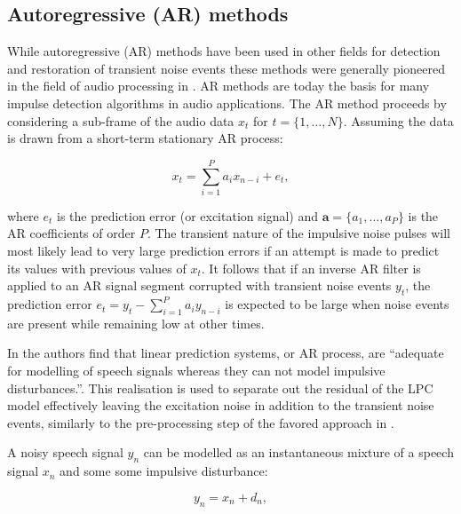 \subsection{Autoregressive (AR) methods}\label{sec:LitRevAR}
While autoregressive (AR) methods have been used in other fields for detection and restoration of transient noise events \cite{Arakawa1986} these methods were generally pioneered in the field of audio processing in \cite{Vaseghi1988thesis}\cite{Vaseghi1988}\cite{Vaseghi1990}. AR methods are today the basis for many impulse detection algorithms in audio applications\cite{Karjalainen1997}\cite{Esquef2000}\cite{Haermae2000}\cite{Esquef2002}\cite{Kauppinen2002}\cite{Wolfe2005}\cite{Subramanya2007}. The AR method proceeds by considering a sub-frame of the audio data $x_t$ for $ t = \{ 1, \ldots, N \}$. Assuming the data is drawn from a short-term stationary AR process:

\begin{equation}\label{eq:ARmodel}
x_t = \sum_{i=1}^P a_i x_{n-i} + e_t,
\end{equation}

where $e_t$ is the prediction error (or excitation signal) and $\mathbf{a} = \{a_1,\ldots,a_P\}$ is the AR coefficients of order $P$. The transient nature of the impulsive noise pulses will most likely lead to very large prediction errors if an attempt is made to predict its values with previous values of $x_t$. It follows that if an inverse AR filter is applied to an AR signal segment corrupted with transient noise events $y_t$, the prediction error $e_t = y_t - \sum_{i=1}^P a_i y_{n-i}$ is expected to be large when noise events are present while remaining low at other times\cite{Godsill1998book}.

In \cite{Vaseghi1990} the authors find that linear prediction systems, or AR process, are ``adequate for modelling of speech signals whereas they can not model impulsive disturbances.''. This realisation is used to separate out the residual of the LPC model effectively leaving the excitation noise in addition to the transient noise events, similarly to the pre-processing step of the favored approach in \cite{Kauppinen2002}.

A noisy speech signal $y_n$ can be modelled as an instantaneous mixture of a speech signal $x_n$ and some some impulsive disturbance:

\begin{equation}\label{eq:Vaseghi1990_1}
y_n = x_n + d_n,
\end{equation}

